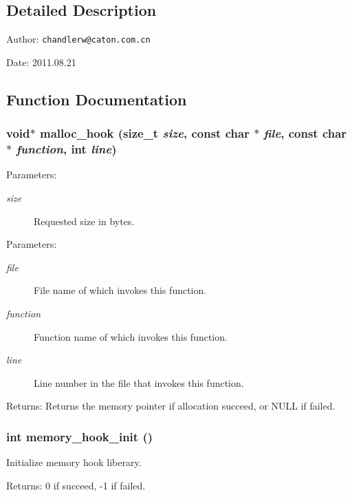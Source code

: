 \subsection{Detailed Description}
\begin{Desc}
\item[Author:]{\tt chandlerw@caton.com.cn} \end{Desc}


\begin{Desc}
\item[Date:]2011.08.21 \end{Desc}


\subsection{Function Documentation}
\subsubsection{\setlength{\rightskip}{0pt plus 5cm}void$\ast$ malloc\_\-hook (size\_\-t {\em size}, const char $\ast$ {\em file}, const char $\ast$ {\em function}, int {\em line})}\label{mem__hook_8h_a67fc8aeb13a19eb250b3322e21ef800}


\begin{Desc}
\item[Parameters:]
\begin{description}
\item[{\em size}]Requested size in bytes. \end{description}
\end{Desc}


\begin{Desc}
\item[Parameters:]
\begin{description}
\item[{\em file}]File name of which invokes this function. \item[{\em function}]Function name of which invokes this function. \item[{\em line}]Line number in the file that invokes this function. \end{description}
\end{Desc}
\begin{Desc}
\item[Returns:]Returns the memory pointer if allocation succeed, or NULL if failed. \end{Desc}
\subsubsection{\setlength{\rightskip}{0pt plus 5cm}int memory\_\-hook\_\-init ()}\label{mem__hook_8h_424e1076451529115c9e92d827a3e603}


Initialize memory hook liberary. 

\begin{Desc}
\item[Returns:]0 if succeed, -1 if failed. \end{Desc}
